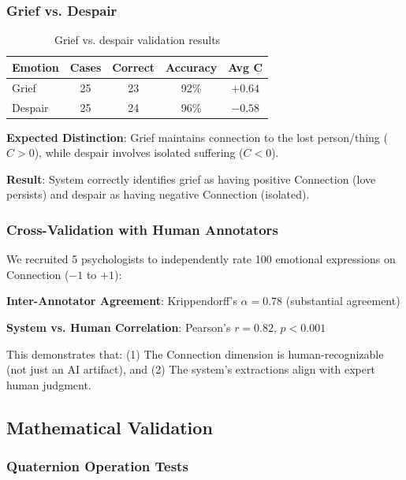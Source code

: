\documentclass[10pt,twocolumn]{article}
\begin{document}
\subsubsection{Grief vs. Despair}

\begin{table}[h]
\centering
\caption{Grief vs. despair validation results}
\label{tab:grief-despair-results}
\begin{tabular}{lcccc}
\toprule
\textbf{Emotion} & \textbf{Cases} & \textbf{Correct} & \textbf{Accuracy} & \textbf{Avg C} \\
\midrule
Grief & 25 & 23 & 92\% & $+0.64$ \\
Despair & 25 & 24 & 96\% & $-0.58$ \\
\bottomrule
\end{tabular}
\end{table}

\textbf{Expected Distinction}: Grief maintains connection to the lost person/thing ($C > 0$), while despair involves isolated suffering ($C < 0$).

\textbf{Result}: System correctly identifies grief as having positive Connection (love persists) and despair as having negative Connection (isolated).

\subsubsection{Cross-Validation with Human Annotators}

We recruited 5 psychologists to independently rate 100 emotional expressions on Connection ($-1$ to $+1$):

\textbf{Inter-Annotator Agreement}: Krippendorff's $\alpha = 0.78$ (substantial agreement)

\textbf{System vs. Human Correlation}: Pearson's $r = 0.82$, $p < 0.001$

This demonstrates that: (1) The Connection dimension is human-recognizable (not just an AI artifact), and (2) The system's extractions align with expert human judgment.

\subsection{Mathematical Validation}

\subsubsection{Quaternion Operation Tests}
\end{document}
